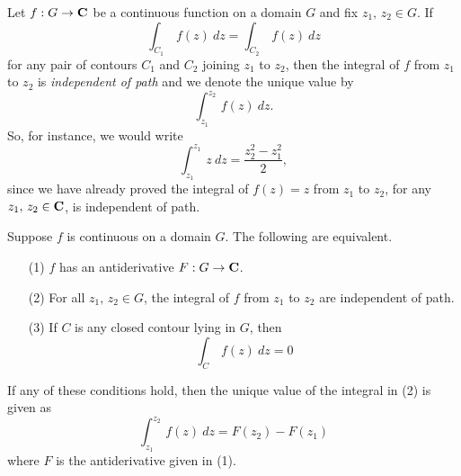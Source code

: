 \begin{definition}
Let $f: G \to \mathbf C$ be a continuous function on a domain $G$ and fix $z_1,\,z_2 \in G$. If
\[\int_{C_1}\,f(z)\ dz = \int_{C_2}\,f(z)\ dz\]
for any pair of contours $C_1$ and $C_2$ joining $z_1$ to $z_2$, then the integral of $f$ from $z_1$ to $z_2$ is \emph{independent of path} and we denote the unique value by
\[\int_{z_1}^{z_2}\,f(z)\ dz.\]
So, for instance, we would write
\[\int_{z_1}^{z_1}\,z\ dz = \frac{z_2^2 - z_1^2}{2},\]
since we have already proved the integral of $f(z) = z$ from $z_1$ to $z_2$, for any $z_1,\,z_2 \in \mathbf C$, is independent of path. 
\end{definition} 

\vspace*{1em}

\begin{theorem}\label{FTCoCI}
Suppose $f$ is continuous on a domain $G$. The following are equivalent. 
\begin{itemize}
\item[(1)] $f$ has an antiderivative $F: G \to \mathbf C$. 
\item[(2)] For all $z_1,\,z_2 \in G$, the integral of $f$ from $z_1$ to $z_2$ are independent of path.
\item[(3)] If $C$ is any closed contour lying in $G$, then
\[\int_C\,f(z)\ dz = 0\]
\end{itemize}
If any of these conditions hold, then the unique value of the integral in (2) is given as
\[\int_{z_1}^{z_2}\,f(z)\ dz = F(z_2) - F(z_1)\]
where $F$ is the antiderivative given in (1).
\end{theorem}
